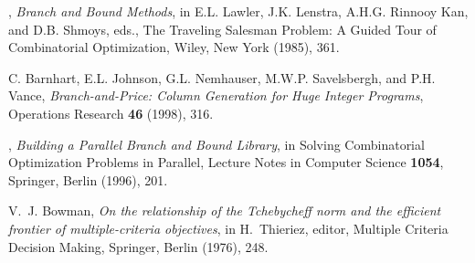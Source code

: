 \begin{thebibliography}{9}

,
{\em Branch and Bound Methods}, in E.L. Lawler, J.K. Lenstra,
A.H.G. Rinnooy Kan, and D.B. Shmoys, eds., The Traveling Salesman
Problem: A Guided Tour of Combinatorial Optimization, Wiley, New York
(1985), 361.



 {\sc C. Barnhart, E.L. Johnson, G.L. Nemhauser, M.W.P.
Savelsbergh, and P.H. Vance}, {\em Branch-and-Price: Column Generation for 
Huge Integer Programs}, Operations Research {\bf 46} (1998), 316. 

, {\em Building a Parallel Branch and Bound
Library}, in Solving Combinatorial Optimization Problems in Parallel,
Lecture Notes in Computer Science {\bf 1054}, Springer, Berlin (1996), 201.





{\sc V.~J. Bowman},
{\em On the relationship of the Tchebycheff norm and the efficient
  frontier of multiple-criteria objectives},
in H.~Thieriez, editor, Multiple Criteria Decision Making,
Springer, Berlin (1976), 248.


\end{thebibliography}
